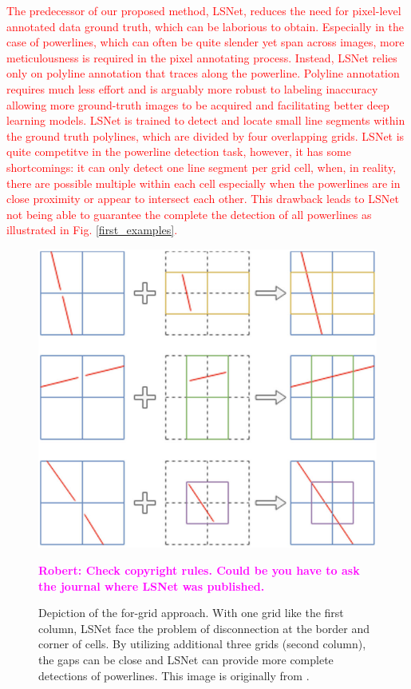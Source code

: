 \documentclass[journal]{IEEEtran}
\newcommand{\commentR}[1]{\textbf{\textcolor{magenta}{Robert: #1}}}
\newcommand{\textK}[1]{\textcolor{red}{#1}}
\begin{document}
\textK{The predecessor of our proposed method, LSNet, reduces the need for pixel-level annotated data ground truth, which can be laborious to obtain. Especially in the case of powerlines, which can often be quite slender yet span across images, more meticulousness is required in the pixel annotating process. Instead, LSNet relies only on polyline annotation that traces along the powerline. Polyline annotation requires much less effort and is arguably more robust to labeling inaccuracy allowing more ground-truth images to be acquired and facilitating better deep learning models. LSNet is trained to detect and locate small line segments within the ground truth polylines, which are divided by four overlapping grids. LSNet is quite competitve in the powerline detection task, however, it has some shortcomings: it can only detect one line segment per grid cell, when, in reality, there are possible multiple within each cell especially when the powerlines are in close proximity or appear to intersect each other. This drawback leads to LSNet not being able to guarantee the complete the detection of all powerlines as illustrated in Fig. \ref{first_examples}.}

\begin{figure}
  \includegraphics[width=\linewidth]{imgs/others/4grid.png}
  \caption{Depiction of the for-grid approach. With one grid like the first column, LSNet face the problem of disconnection at the border and corner of cells. By utilizing additional three grids (second column), the gaps can be close and LSNet can provide more complete detections of powerlines. This image is originally from \cite{Nguyen2020}.} \commentR{Check copyright rules. Could be you have to ask the journal where LSNet was published.}
  \label{4grid}
\end{figure}
\end{document}

